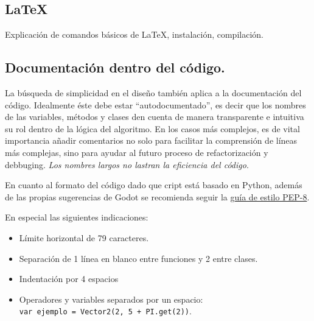 \subsection{LaTeX}
Explicación de comandos básicos de \LaTeX, instalación, compilación. 

\subsection{Documentación dentro del código.}\label{flujo:documentacion-en-codigo}
La búsqueda de simplicidad en el diseño también aplica a la documentación del código. Idealmente éste debe estar “autodocumentado”, es decir que los nombres de las variables, métodos y clases den cuenta de manera transparente e intuitiva su rol dentro de la lógica del algoritmo. En los casos más complejos, es de vital importancia añadir comentarios no solo para facilitar la comprensión de líneas más complejas, sino para ayudar al futuro proceso de refactorización y debbuging. \emph{Los nombres largos no lastran la eficiencia del código}.

En cuanto al formato del código dado que cript está basado en Python, además de las propias sugerencias de Godot se recomienda seguir la \href{https://www.python.org/dev/peps/pep-0008/}{guía de estilo PEP-8}.

En especial las siguientes indicaciones:
\begin{itemize}
	\item Límite horizontal de 79 caracteres. 
	\item Separación de 1 línea en blanco entre funciones y 2 entre clases.
	\item Indentación por 4 espacios
	\item Operadores y variables separados por un espacio:\\\small \texttt{var ejemplo = Vector2(2, 5 + PI.get(2))}.
\end{itemize}

